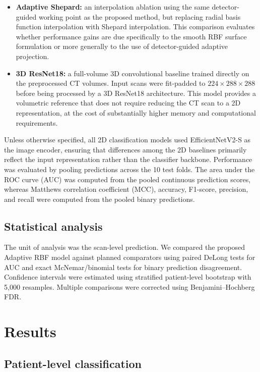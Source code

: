 \documentclass[preprint,12pt]{elsarticle}
\begin{document}
\begin{itemize}
    \item \textbf{Adaptive Shepard:} an interpolation ablation using the same detector-guided working point as the proposed method, but replacing radial basis function interpolation with Shepard interpolation. This comparison evaluates whether performance gains are due specifically to the smooth RBF surface formulation or more generally to the use of detector-guided adaptive projection.

    \item \textbf{3D ResNet18:} a full-volume 3D convolutional baseline trained directly on the preprocessed CT volumes. Input scans were fit-padded to $224 \times 288 \times 288$ before being processed by a 3D ResNet18 architecture. This model provides a volumetric reference that does not require reducing the CT scan to a 2D representation, at the cost of substantially higher memory and computational requirements.
\end{itemize}

Unless otherwise specified, all 2D classification models used EfficientNetV2-S as the image encoder, ensuring that differences among the 2D baselines primarily reflect the input representation rather than the classifier backbone. Performance was evaluated by pooling predictions across the 10 test folds. The area under the ROC curve (AUC) was computed from the pooled continuous prediction scores, whereas Matthews correlation coefficient (MCC), accuracy, F1-score, precision, and recall were computed from the pooled binary predictions.

\subsection{Statistical analysis}

The unit of analysis was the scan-level prediction. We compared the proposed Adaptive RBF model against planned comparators using paired DeLong tests for AUC and exact McNemar/binomial tests for binary prediction disagreement. Confidence intervals were estimated using stratified patient-level bootstrap with 5,000 resamples. Multiple comparisons were corrected using Benjamini--Hochberg FDR.

\section{Results}

\subsection{Patient-level classification}
\end{document}
